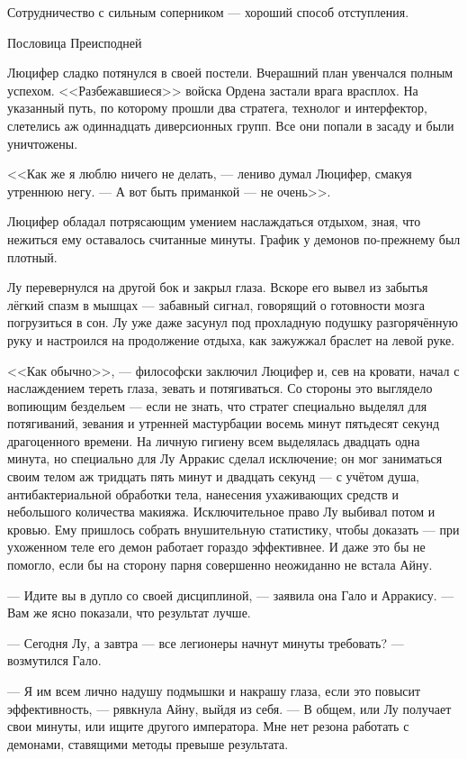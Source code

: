 \epigraph
{Сотрудничество с сильным соперником --- хороший способ отступления.}
{Пословица Преисподней}

Люцифер сладко потянулся в своей постели.
Вчерашний план увенчался полным успехом.
<<Разбежавшиеся>> войска Ордена застали врага врасплох.
На указанный путь, по которому прошли два стратега, технолог и интерфектор, слетелись аж одиннадцать диверсионных групп.
Все они попали в засаду и были уничтожены.

<<Как же я люблю ничего не делать, --- лениво думал Люцифер, смакуя утреннюю негу.
--- А вот быть приманкой --- не очень>>.

Люцифер обладал потрясающим умением наслаждаться отдыхом, зная, что нежиться ему оставалось считанные минуты.
График у демонов по-прежнему был плотный.

Лу перевернулся на другой бок и закрыл глаза.
Вскоре его вывел из забытья лёгкий спазм в мышцах --- забавный сигнал, говорящий о готовности мозга погрузиться в сон.
Лу уже даже засунул под прохладную подушку разгорячённую руку и настроился на продолжение отдыха, как зажужжал браслет на левой руке.

<<Как обычно>>, --- философски заключил Люцифер и, сев на кровати, начал с наслаждением тереть глаза, зевать и потягиваться.
Со стороны это выглядело вопиющим бездельем --- если не знать, что стратег специально выделял для потягиваний, зевания и утренней мастурбации восемь минут пятьдесят секунд драгоценного времени.
На личную гигиену всем выделялась двадцать одна минута, но специально для Лу Арракис сделал исключение;
он мог заниматься своим телом аж тридцать пять минут и двадцать секунд --- с учётом душа, антибактериальной обработки тела, нанесения ухаживающих средств и небольшого количества макияжа.
Исключительное право Лу выбивал потом и кровью.
Ему пришлось собрать внушительную статистику, чтобы доказать --- при ухоженном теле его демон работает гораздо эффективнее.
И даже это бы не помогло, если бы на сторону парня совершенно неожиданно не встала Айну.

--- Идите вы в дупло со своей дисциплиной, --- заявила она Гало и Арракису.
--- Вам же ясно показали, что результат лучше.

--- Сегодня Лу, а завтра --- все легионеры начнут минуты требовать? --- возмутился Гало.

--- Я им всем лично надушу подмышки и накрашу глаза, если это повысит эффективность, --- рявкнула Айну, выйдя из себя.
--- В общем, или Лу получает свои минуты, или ищите другого императора\FM.
Мне нет резона работать с демонами, ставящими методы превыше результата.

